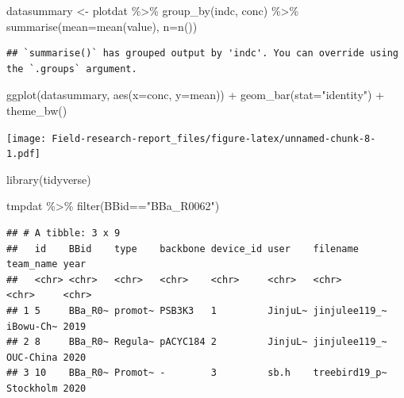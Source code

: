 \documentclass[
]{article}
\newenvironment{Shaded}{\begin{snugshade}}{\end{snugshade}}
\newcommand{\AttributeTok}[1]{\textcolor[rgb]{0.77,0.63,0.00}{#1}}
\newcommand{\FunctionTok}[1]{\textcolor[rgb]{0.00,0.00,0.00}{#1}}
\newcommand{\NormalTok}[1]{#1}
\newcommand{\OtherTok}[1]{\textcolor[rgb]{0.56,0.35,0.01}{#1}}
\newcommand{\SpecialCharTok}[1]{\textcolor[rgb]{0.00,0.00,0.00}{#1}}
\newcommand{\StringTok}[1]{\textcolor[rgb]{0.31,0.60,0.02}{#1}}
\begin{document}
\begin{Shaded}
\begin{Highlighting}[]
\NormalTok{datasummary }\OtherTok{\textless{}{-}}\NormalTok{ plotdat }\SpecialCharTok{\%\textgreater{}\%} 
  \FunctionTok{group\_by}\NormalTok{(indc, conc) }\SpecialCharTok{\%\textgreater{}\%} 
  \FunctionTok{summarise}\NormalTok{(}\AttributeTok{mean=}\FunctionTok{mean}\NormalTok{(value), }\AttributeTok{n=}\FunctionTok{n}\NormalTok{()) }
\end{Highlighting}
\end{Shaded}

\begin{verbatim}
## `summarise()` has grouped output by 'indc'. You can override using the `.groups` argument.
\end{verbatim}

\begin{Shaded}
\begin{Highlighting}[]
\FunctionTok{ggplot}\NormalTok{(datasummary, }\FunctionTok{aes}\NormalTok{(}\AttributeTok{x=}\NormalTok{conc, }\AttributeTok{y=}\NormalTok{mean)) }\SpecialCharTok{+}
  \FunctionTok{geom\_bar}\NormalTok{(}\AttributeTok{stat=}\StringTok{"identity"}\NormalTok{) }\SpecialCharTok{+}
  \FunctionTok{theme\_bw}\NormalTok{()}
\end{Highlighting}
\end{Shaded}

\texttt{[image: Field-research-report\_files/figure-latex/unnamed-chunk-8-1.pdf]}

\begin{Shaded}
\begin{Highlighting}[]
\FunctionTok{library}\NormalTok{(tidyverse)}

\NormalTok{tmpdat }\SpecialCharTok{\%\textgreater{}\%} 
  \FunctionTok{filter}\NormalTok{(BBid}\SpecialCharTok{==}\StringTok{"BBa\_R0062"}\NormalTok{)}
\end{Highlighting}
\end{Shaded}

\begin{verbatim}
## # A tibble: 3 x 9
##   id    BBid    type    backbone device_id user    filename      team_name year 
##   <chr> <chr>   <chr>   <chr>    <chr>     <chr>   <chr>         <chr>     <chr>
## 1 5     BBa_R0~ promot~ PSB3K3   1         JinjuL~ jinjulee119_~ iBowu-Ch~ 2019 
## 2 8     BBa_R0~ Regula~ pACYC184 2         JinjuL~ jinjulee119_~ OUC-China 2020 
## 3 10    BBa_R0~ Promot~ -        3         sb.h    treebird19_p~ Stockholm 2020
\end{verbatim}
\end{document}
